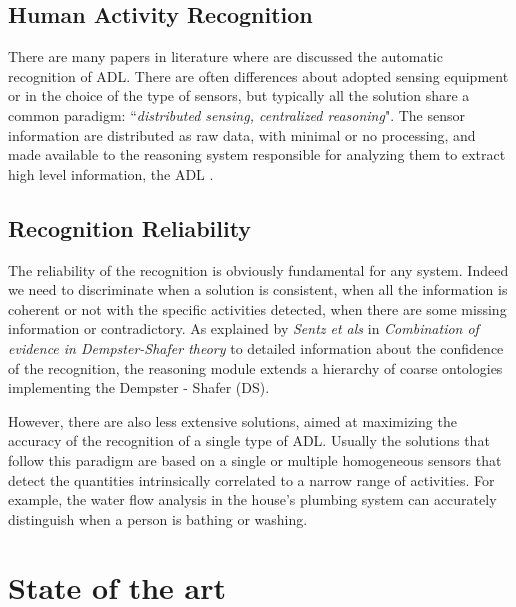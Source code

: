 \documentclass{thesisreport}
\begin{document}
\section{Human Activity Recognition}
There are many papers in literature where are discussed the automatic recognition of ADL. There are often differences about adopted sensing equipment or in the choice of the type of sensors, but typically all the solution share a common paradigm: ``\textit{distributed sensing, centralized reasoning}". The sensor information are distributed as raw data, with minimal or no processing, and made available to the reasoning system responsible for analyzing them to extract high level information, the ADL \cite{buoncompagni2017towards}.   


\section{Recognition Reliability} \label{reliability}
The reliability of the recognition is obviously fundamental for any system. Indeed we need to discriminate when a solution is consistent, when all the information is coherent or not with the specific activities detected, when there are some missing information or contradictory.
As explained by \textit{Sentz et als} in \textit{Combination of evidence in Dempster-Shafer theory} \cite{sentz2002combination} to detailed information about the confidence of the recognition, the reasoning module extends a hierarchy of coarse ontologies implementing the Dempster - Shafer (DS). 

However, there are also less extensive solutions, aimed at maximizing the accuracy of the recognition of a single type of ADL. Usually the solutions that follow this paradigm are based on a single or multiple homogeneous sensors that detect the quantities intrinsically correlated to a narrow range of activities. For example, the  water flow analysis in the house's plumbing system can accurately distinguish when a person is bathing or washing.

 \chapter{State of the art}
 
\end{document}
